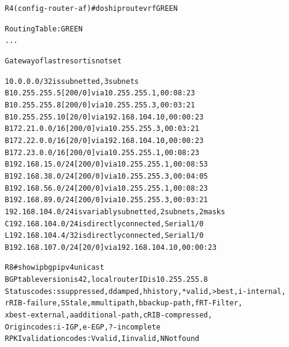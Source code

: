 \documentclass[12pt,twoside,a4paper]{report}
\begin{document}
\noindent
{\selectfont
\begin{small}
\begin{alltt}
R4(config-router-af)#do sh ip route vrf GREEN

Routing Table: GREEN
...

Gateway of last resort is not set

      10.0.0.0/32 is subnetted, 3 subnets
B        10.255.255.5 [200/0] via 10.255.255.1, 00:08:23
B        10.255.255.8 [200/0] via 10.255.255.3, 00:03:21
B        10.255.255.10 [20/0] via 192.168.104.10, 00:00:23
B     172.21.0.0/16 [200/0] via 10.255.255.3, 00:03:21
B     172.22.0.0/16 [20/0] via 192.168.104.10, 00:00:23
B     172.23.0.0/16 [200/0] via 10.255.255.1, 00:08:23
B     192.168.15.0/24 [200/0] via 10.255.255.1, 00:08:53
B     192.168.38.0/24 [200/0] via 10.255.255.3, 00:04:05
B     192.168.56.0/24 [200/0] via 10.255.255.1, 00:08:23
B     192.168.89.0/24 [200/0] via 10.255.255.3, 00:03:21
      192.168.104.0/24 is variably subnetted, 2 subnets, 2 masks
C        192.168.104.0/24 is directly connected, Serial1/0
L        192.168.104.4/32 is directly connected, Serial1/0
B     192.168.107.0/24 [20/0] via 192.168.104.10, 00:00:23





R8#show ip bgp ipv4 unicast 
BGP table version is 42, local router ID is 10.255.255.8
Status codes: s suppressed, d damped, h history, * valid, > best, i - internal, 
              r RIB-failure, S Stale, m multipath, b backup-path, f RT-Filter, 
              x best-external, a additional-path, c RIB-compressed, 
Origin codes: i - IGP, e - EGP, ? - incomplete
RPKI validation codes: V valid, I invalid, N Not found


\end{alltt}
\end{small}}
\end{document}
